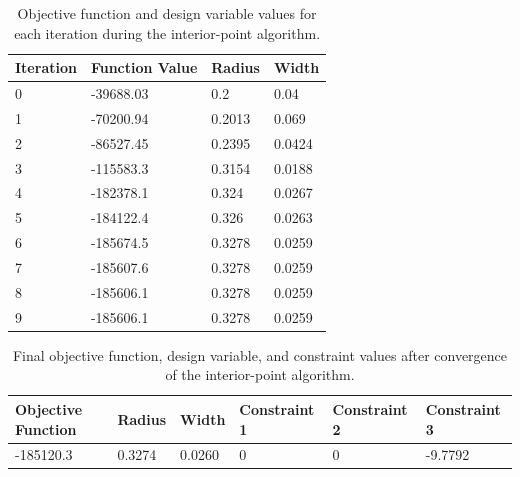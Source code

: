\documentclass[11pt]{article}
\begin{document}
\begin{solution}
\begin{table}[htbp]
	\centering
    \begin{tabular}{|l|l|l|l|}
        \hline
       Iteration & Function Value & Radius & Width\\ \hline
0 & -39688.03 & 0.2 & 0.04\\ 
1 & -70200.94 & 0.2013 & 0.069\\ 
2 & -86527.45 & 0.2395 & 0.0424\\ 
3 & -115583.3 & 0.3154 & 0.0188\\ 
4 & -182378.1 & 0.324 & 0.0267\\ 
5 & -184122.4 & 0.326 & 0.0263\\ 
6 & -185674.5 & 0.3278 & 0.0259\\ 
7 & -185607.6 & 0.3278 & 0.0259\\ 
8 & -185606.1 & 0.3278 & 0.0259\\ 
9 & -185606.1 & 0.3278 & 0.0259\\ 
        \hline
    \end{tabular}
	\caption{Objective function and design variable values for each iteration during the interior-point algorithm.}
	\label{Table3}
\end{table}

\begin{table}[htbp]
	\centering
    \begin{tabular}{|l|l|l|l|l|l|}
        \hline
	Objective Function & Radius & Width & Constraint 1 & Constraint 2 & Constraint 3 \\ \hline
	-185120.3 & 0.3274 & 0.0260 & 0 & 0 & -9.7792 \\ 
	\hline
    \end{tabular}
	\caption{Final objective function, design variable, and constraint values after convergence of the interior-point algorithm.}
	\label{Table4}
\end{table}

\end{solution}
\end{document}
